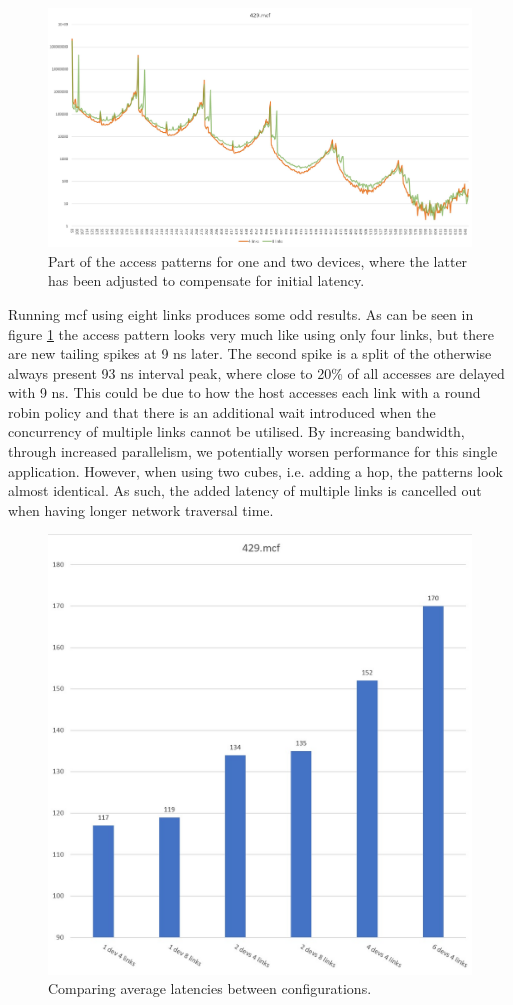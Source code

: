 \begin{figure}[!ht]
    \centering
    \includegraphics[width=1.0\linewidth]{figure/429-2_4-8.jpg}
    \caption{Part of the access patterns for one and two devices, where the latter has been adjusted to compensate for initial latency.}
    \label{Memory-access-429-link-compare}
\end{figure}

Running mcf using eight links produces some odd results. As can be seen in figure \ref{Memory-access-429-link-compare} the access pattern looks very much like using only four links, but there are new tailing spikes at 9 ns later. The second spike is a split of the otherwise always present 93 ns interval peak, where close to 20\% of all accesses are delayed with 9 ns. This could be due to how the host accesses each link with a round robin policy and that there is an additional wait introduced when the concurrency of multiple links cannot be utilised. By increasing bandwidth, through increased parallelism, we potentially worsen performance for this single application. However, when using two cubes, i.e. adding a hop, the patterns look almost identical. As such, the added latency of multiple links is cancelled out when having longer network traversal time.
\bigskip

\begin{figure}[!ht]
    \centering
    \includegraphics[width=0.75\linewidth]{figure/429-averages.jpg}
    \caption{Comparing average latencies between configurations.}
    \label{Memory-access-429-average-latency}
\end{figure}

